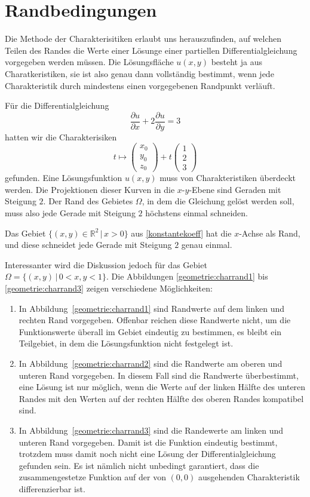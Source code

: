 \section{Randbedingungen}
Die Methode der Charakterisitiken erlaubt uns herauszufinden, auf welchen
Teilen des Randes die Werte einer Lösunge einer partiellen
Differentialgleichung vorgegeben werden müssen.
Die Lösungsfläche $u(x,y)$ besteht ja aus Charatkeristiken, sie ist also
genau dann vollständig bestimmt, wenn jede Charakteristik durch mindestens 
einen vorgegebenen Randpunkt verläuft.

Für die Differentialgleichung
\begin{equation}
\frac{\partial u}{\partial x}+2\frac{\partial u}{\partial y}=3
\label{geometrie:knickbeispiel}
\end{equation}
hatten wir die Charakterisiken 
\[
t\mapsto\begin{pmatrix}x_0\\y_0\\z_0\end{pmatrix}+t\begin{pmatrix}1\\2\\3\end{pmatrix}
\]
gefunden. Eine Lösungsfunktion $u(x,y)$ muss von Charakteristiken
überdeckt werden. 
Die Projektionen dieser Kurven in die $x$-$y$-Ebene sind Geraden
mit Steigung $2$. Der Rand des Gebietes $\Omega$, in dem die Gleichung gelöst
werden soll, muss also jede Gerade mit Steigung $2$ höchstens einmal
schneiden.

Das Gebiet $\{(x,y)\in\mathbb R^2\,|\, x >0\}$  aus \ref{konstantekoeff}
hat die $x$-Achse als Rand, und diese schneidet jede Gerade mit Steigung
$2$ genau einmal.

Interessanter wird die Diskussion jedoch für das Gebiet
$\Omega=\{(x,y)\,|\,0<x,y<1\}$. Die Abbildungen \ref{geometrie:charrand1}
bis \ref{geometrie:charrand3} zeigen verschiedene Möglichkeiten:
\begin{enumerate}
\item
In Abbildung~\ref{geometrie:charrand1} sind Randwerte auf dem linken
und rechten Rand vorgegeben. Offenbar reichen diese Randwerte nicht, um
die Funktionswerte überall im Gebiet eindeutig zu bestimmen, es bleibt
ein Teilgebiet, in dem die Lösungsfunktion nicht festgelegt ist.
\item
In Abbildung~\ref{geometrie:charrand2}
sind die Randwerte am oberen und unteren Rand vorgegeben.
In diesem Fall sind die Randwerte überbestimmt, eine Lösung ist
nur möglich, wenn die Werte auf der linken Hälfte des unteren
Randes mit den Werten auf der rechten Hälfte des oberen Randes
kompatibel sind.
\item
In Abbildung~\ref{geometrie:charrand3}
sind die Randewerte am linken und unteren Rand vorgegeben.
Damit ist die Funktion eindeutig bestimmt, trotzdem
muss damit noch nicht eine Lösung der Differentialgleichung
gefunden sein.
Es ist nämlich nicht unbedingt garantiert, dass die zusammengestetze
Funktion 
auf der von $(0,0)$ ausgehenden Charakteristik differenzierbar ist.
\end{enumerate}

